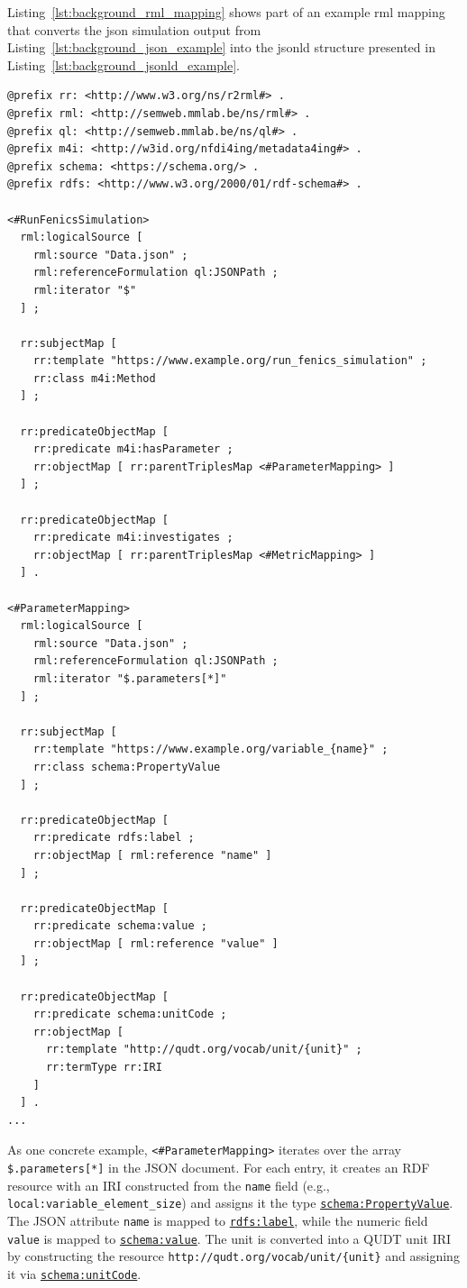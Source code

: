 Listing~\ref{lst:background_rml_mapping} shows part of an example \gls{rml} mapping that converts the \gls{json} simulation output from Listing~\ref{lst:background_json_example} into the \gls{jsonld} structure presented in Listing~\ref{lst:background_jsonld_example}.

\begin{lstlisting}[float=htbp,style=turtle, caption={Subset of a RML mapping which converts JSON data in Listing~\ref{lst:background_json_example} to JSON-LD in Listing~\ref{lst:background_jsonld_example}}, label={lst:background_rml_mapping}]
@prefix rr: <http://www.w3.org/ns/r2rml#> .
@prefix rml: <http://semweb.mmlab.be/ns/rml#> .
@prefix ql: <http://semweb.mmlab.be/ns/ql#> .
@prefix m4i: <http://w3id.org/nfdi4ing/metadata4ing#> .
@prefix schema: <https://schema.org/> .
@prefix rdfs: <http://www.w3.org/2000/01/rdf-schema#> .

<#RunFenicsSimulation>
  rml:logicalSource [
    rml:source "Data.json" ;
    rml:referenceFormulation ql:JSONPath ;
    rml:iterator "$"
  ] ;
  
  rr:subjectMap [
    rr:template "https://www.example.org/run_fenics_simulation" ;
    rr:class m4i:Method
  ] ;
  
  rr:predicateObjectMap [
    rr:predicate m4i:hasParameter ;
    rr:objectMap [ rr:parentTriplesMap <#ParameterMapping> ]
  ] ;
  
  rr:predicateObjectMap [
    rr:predicate m4i:investigates ;
    rr:objectMap [ rr:parentTriplesMap <#MetricMapping> ]
  ] .

<#ParameterMapping>
  rml:logicalSource [
    rml:source "Data.json" ;
    rml:referenceFormulation ql:JSONPath ;
    rml:iterator "$.parameters[*]"
  ] ;
  
  rr:subjectMap [
    rr:template "https://www.example.org/variable_{name}" ;
    rr:class schema:PropertyValue
  ] ;
  
  rr:predicateObjectMap [
    rr:predicate rdfs:label ;
    rr:objectMap [ rml:reference "name" ]
  ] ;
  
  rr:predicateObjectMap [
    rr:predicate schema:value ;
    rr:objectMap [ rml:reference "value" ]
  ] ;
  
  rr:predicateObjectMap [
    rr:predicate schema:unitCode ;
    rr:objectMap [
      rr:template "http://qudt.org/vocab/unit/{unit}" ;
      rr:termType rr:IRI
    ]
  ] .
...
\end{lstlisting}

As one concrete example, \texttt{<\#ParameterMapping>} iterates over the array 
\texttt{\$.parameters[*]} in the JSON document. For each entry, it creates an RDF 
resource with an IRI constructed from the \texttt{name} field 
(e.g., \texttt{local:variable\_element\_size}) and assigns it the type 
\href{https://schema.org/PropertyValue}{\texttt{schema:PropertyValue}}. 
The JSON attribute \texttt{name} is mapped to 
\href{http://www.w3.org/2000/01/rdf-schema\#label}{\texttt{rdfs:label}}, while the 
numeric field \texttt{value} is mapped to 
\href{https://schema.org/value}{\texttt{schema:value}}. The unit is converted into 
a QUDT unit IRI by constructing the resource 
\texttt{http://qudt.org/vocab/unit/\{unit\}} and assigning it via 
\href{https://schema.org/unitCode}{\texttt{schema:unitCode}}.

